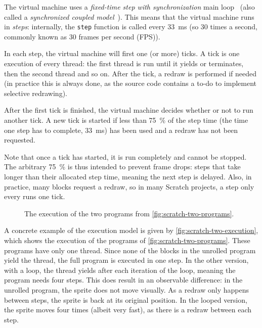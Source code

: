 \documentclass[../main]{subfiles}
\begin{document}
The virtual machine uses a \emph{fixed-time step with synchronization} main loop~\autocite{nystromGameProgrammingPatterns2014} (also called a \emph{synchronized coupled model}~\autocite{valenteRealTimeGame2005}).
This means that the virtual machine runs in \emph{steps}: internally, the \texttt{step} function is called every \qty{33}{\milli\second} (so 30 times a second, commonly known as 30 frames per second (FPS)).

In each step, the virtual machine will first one (or more) ticks.
A tick is one execution of every thread: the first thread is run until it yields or terminates, then the second thread and so on.
After the tick, a redraw is performed if needed (in practice this is always done, as the source code contains a to-do to implement selective redrawing).

After the first tick is finished, the virtual machine decides whether or not to run another tick.
A new tick is started if less than \qty{75}{\percent} of the step time (the time one step has to complete, \qty{33}{\milli\second}) has been used and a redraw has not been requested.

Note that once a tick has started, it is run completely and cannot be stopped.
The arbitrary \qty{75}{\percent} is thus intended to prevent frame drops: steps that take longer than their allocated step time, meaning the next step is delayed.
Also, in practice, many blocks request a redraw, so in many Scratch projects, a step only every runs one tick.

\begin{figure}
    \centering
    \begin{subfigure}{0.40\textwidth}
        
    \end{subfigure}
    \begin{subfigure}{0.59\textwidth}
        
    \end{subfigure}
    \caption{The execution of the two programs from \vref{fig:scratch-two-programs}.}\label{fig:scratch-two-execution}
\end{figure}

A concrete example of the execution model is given by \vref{fig:scratch-two-execution}, which shows the execution of the programs of \vref{fig:scratch-two-programs}.
These programs have only one thread.
Since none of the blocks in the unrolled program yield the thread, the full program is executed in one step.
In the other version, with a loop, the thread yields after each iteration of the loop, meaning the program needs four steps.
This does result in an observable difference: in the unrolled program, the sprite does not move visually.
As a redraw only happens between steps, the sprite is back at its original position.
In the looped version, the sprite moves four times (albeit very fast), as there is a redraw between each step.
\end{document}
